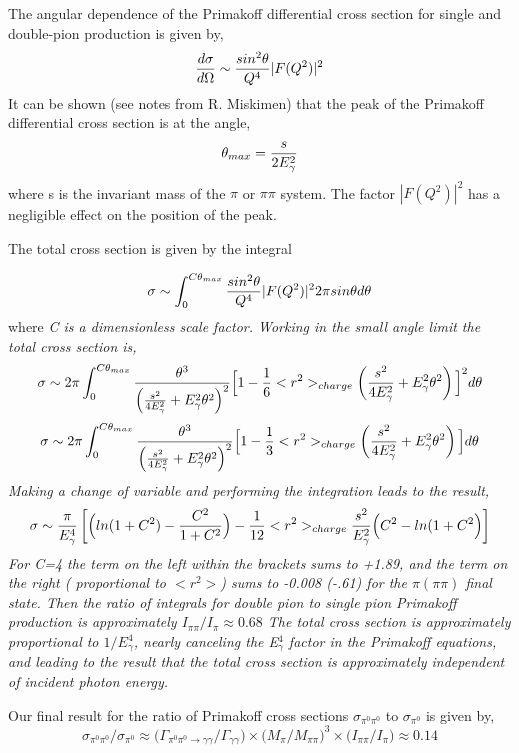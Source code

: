 The angular dependence of the Primakoff differential cross section for single and double-pion production is given by,
$$ {d\sigma \over d \Omega} \sim {sin^2 \theta \over Q^4}|F(Q^2)|^2$$
It can be shown (see notes from R. Miskimen) that the peak of the Primakoff differential cross section is at the angle,
$$ \theta_{max}={s \over 2 E^2_\gamma}$$
where s is the invariant mass of the $\pi$ or $\pi \pi$ system.  The factor $|F(Q^2)|^2$ has a negligible effect on the position of the peak. 

The total cross section is given by the integral

$$ \sigma \sim \int^{C\theta_{max}}_0 {sin^2 \theta \over Q^4}|F(Q^2)|^2 2 \pi sin \theta d\theta$$
where \it C \rm is a dimensionless scale factor. Working in the small angle limit the total cross section is,
$$\sigma \sim 2\pi \int^{C\theta_{max}}_0 
{\theta^3 \over \left( {s^2 \over 4E^2_\gamma}+ E^2_\gamma \theta^2  \right)^2} 
\Big[ 1-{1 \over 6}<r^2>_{charge}\left( {s^2 \over 4E^2_\gamma}+ E^2_\gamma \theta^2  \right)\Big]^2
d \theta$$
$$\sigma \sim 2\pi \int^{C\theta_{max}}_0 
{\theta^3 \over \left( {s^2 \over 4E^2_\gamma}+ E^2_\gamma \theta^2  \right)^2} 
\Big[ 1-{1 \over 3}<r^2>_{charge}\left( {s^2 \over 4E^2_\gamma}+ E^2_\gamma \theta^2  \right)\Big]
d \theta$$
Making a change of variable and performing the integration leads to the result, 
$$ \sigma \sim {\pi \over E^4_\gamma}
\left[ \Big( ln(1+C^2)-{C^2 \over 1+C^2}  \Big)
- {1 \over 12}<r^2>_{charge}{s^2 \over E^2_\gamma}
\Big(C^2-ln(1+C^2 \Big) \right]$$
For C=4 the term on the left within the brackets sums to +1.89, and the term on the right ( proportional to $<r^2>$) sums to -0.008 (-.61) for the $\pi (\pi \pi)$ final state.  Then the ratio of integrals for double pion to single pion Primakoff production is approximately $I_{\pi\pi} / I_{\pi} \approx 0.68$
The total cross section is approximately proportional to $1/E^4_\gamma$, nearly canceling the E$^4_\gamma$ factor in the Primakoff equations, and leading to the result that the total cross section is approximately independent of incident photon energy.   


Our final result for the ratio of Primakoff cross sections $\sigma_{\pi^0 \pi^0}$ to $ \sigma_{\pi^0}$ is given by, 
$$  \sigma_{\pi^0 \pi^0}   \Big/ \sigma_{ \pi^0}   
\approx 
\Big(\Gamma_{\pi^0 \pi^0 \rightarrow \gamma \gamma}
\Big/ \Gamma_{\gamma \gamma} \Big)
\times \Big( M_\pi \Big/ 
M_{\pi \pi}\Big)^3\times \Big( I_{\pi \pi} \Big/ I_\pi \Big)
\approx 0.14$$



